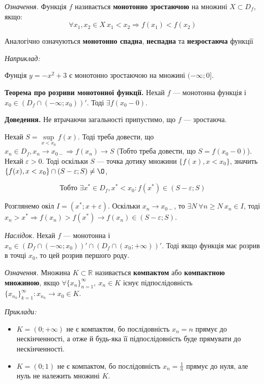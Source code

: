 \documentclass[12pt]{report}
\begin{document}
\textit{Означення.} Функція $f$ називається \textbf{монотонно зростаючою} на множині $X \subset D_f$, якщо:
$$\forall x_1, x_2 \in X\ x_1 < x_2 \Longrightarrow f(x_1) < f(x_2)$$

Аналогічно означуються \textbf{монотонно спадна}, \textbf{неспадна} та \textbf{незростаюча} функції

\textit{Наприклад:} 

Фунція $y = -x^2 + 3$ є монотонно зростаючою на множині $(-\infty; 0]$.

\vspace{5mm}

\textbf{Теорема про розриви монотонної функції.} Нехай $f$ --- монотонна функція і $x_0 \in (D_f\cap (-\infty; x_0{}))'$. Тоді $\exists f(x_0 - 0)$.

\textbf{Доведення.} Не втрачаючи загальності припустимо, що $f$ --- зростаюча.

Нехай $S = \sup\limits_{x < x_0} f(x)$. Тоді треба довести, що $x_n \in D_f, x_n \to x_{0-} \Longrightarrow f(x_n) \to S$ (Тобто треба довести, що $S = f(x_0 - 0)$). Нехай $\varepsilon > 0$. Тоді оскільки $S$ --- точка дотику множини $\{ f(x), x < x_0\}$, значить $\{ f(x), x < x_0\} \cap (S - \varepsilon; S) \neq \O$,

$$\textrm{Тобто } \exists x^{*} \in D_f, x^{*} < x_0 : f(x^*) \in (S - \varepsilon; S)$$

Розглянемо окіл $I = (x^*; x + \varepsilon)$. Оскільки $x_n \to x_{0-}$, то $\exists N \ \forall n \geq N\ x_n \in I$, тоді $x_n > x^* \Longrightarrow f(x_n) > f(x^*) \longrightarrow f(x_n) \in (S - \varepsilon; S)$.

\textit{Наслідок.} Нехай $f$ --- монотонна і $x_n \in (D_f \cap (-\infty; x_0))' \cap (D_f \cap (x_0; +\infty))'$. Тоді якщо функція має розрив в точці $x_0$, то цей розрив першого роду.

\vspace{5mm}

\textit{Означення.} Множина $K \subset \mathbb{R}$ називається \textbf{компактом} або \textbf{компактною множиною}, якщо $\forall \{ x_n\}_{n=1}^{\infty},\ x_n \in K$ існує підпослідовність $\{x_{n_k}\}_{k=1}^{\infty} : x_{n_k} \to x_0 \in K{}$.

\textit{Приклади:}

\begin{itemize}
    \item $K = (0; +\infty)$ не є компактом, бо послідовність $x_n = n$ прямує до нескінченності, а отже й будь-яка її підпослідовність буде прямувати до нескінченності.
    \item $K = (0;1)$ не є компактом, бо послідовність $x_n = \frac{1}{n}$ прямує до нуля, але нуль не належить множині $K$.
\end{itemize}
\end{document}
